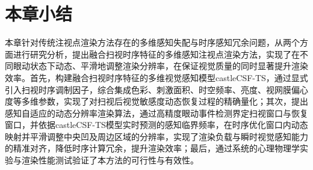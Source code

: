 \section{本章小结}
本章针对传统注视点渲染方法存在的多维感知失配与时序感知冗余问题，从两个方面进行研究分析，提出融合扫视时序特征的多维感知注视点渲染方法，实现了在不同眼动状态下动态、平滑地调整渲染分辨率，在保证视觉质量的同时显著提升渲染效率。首先，构建融合扫视时序特征的多维视觉感知模型castleCSF-TS，通过显式引入扫视时序调制因子，综合集成色彩、刺激面积、时空频率、亮度、视网膜偏心度等多维参数，实现了对扫视后视觉敏感度动态恢复过程的精确量化；其次，提出感知自适应的动态分辨率渲染算法，通过高精度眼动事件检测界定扫视窗口与恢复窗口，并依据castleCSF-TS模型实时预测的感知临界频率，在时序优化窗口内动态映射并平滑调整中央凹及周边区域的分辨率，实现了渲染负载与瞬时视觉感知能力的精准对齐，降低时序计算冗余，提升渲染效率；最后，通过系统的心理物理学实验与渲染性能测试验证了本方法的可行性与有效性。